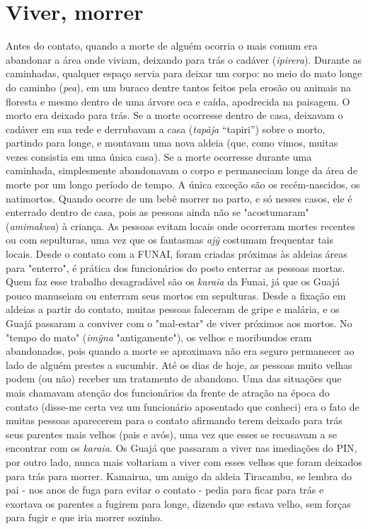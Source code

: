 \section{Viver, morrer}\label{viver-morrer}

Antes do contato, quando a morte de alguém ocorria o mais comum era
abandonar a área onde viviam, deixando para trás o cadáver
(\emph{ipirera}). Durante as caminhadas, qualquer espaço servia para
deixar um corpo: no meio do mato longe do caminho (\emph{pea}), em um
buraco dentre tantos feitos pela erosão ou animais na floresta e mesmo
dentro de uma árvore oca e caída, apodrecida na paisagem. O morto era
deixado para trás. Se a morte ocorresse dentro de casa, deixavam o
cadáver em sua rede e derrubavam a casa (\emph{tapãja} ``tapiri'') sobre
o morto, partindo para longe, e montavam uma nova aldeia (que, como
vimos, muitas vezes consistia em uma única casa). Se a morte ocorresse
durante uma caminhada, simplesmente abandonavam o corpo e permaneciam
longe da área de morte por um longo período de tempo. A única exceção
são os recém-nascidos, os natimortos. Quando ocorre de um bebê morrer no
parto, e só nesses casos, ele é enterrado dentro de casa, pois as
pessoas ainda não se "acostumaram" (\emph{amimakwa}) à criança. As
pessoas evitam locais onde ocorreram mortes recentes ou com sepulturas,
uma vez que os fantasmas \emph{ajỹ} costumam frequentar tais locais.
Desde o contato com a FUNAI, foram criadas próximas às aldeias áreas
para "enterro", é prática dos funcionários do posto enterrar as pessoas
mortas. Quem faz esse trabalho desagradável são os \emph{karaia} da
Funai, já que os Guajá pouco manuseiam ou enterram seus mortos em
sepulturas. Desde a fixação em aldeias a partir do contato, muitas
pessoas faleceram de gripe e malária, e os Guajá passaram a conviver com
o "mal-estar" de viver próximos aos mortos. No "tempo do mato"
(\emph{imỹna} "antigamente"), os velhos e moribundos eram abandonados,
pois quando a morte se aproximava não era seguro permanecer ao lado de
alguém prestes a sucumbir. Até os dias de hoje, as pessoas muito velhas
podem (ou não) receber um tratamento de abandono. Uma das situações que
mais chamavam atenção dos funcionários da frente de atração na época do
contato (disse-me certa vez um funcionário aposentado que conheci) era o
fato de muitas pessoas aparecerem para o contato afirmando terem deixado
para trás seus parentes mais velhos (pais e avós), uma vez que esses se
recusavam a se encontrar com os \emph{karaia}. Os Guajá que passaram a
viver nas imediações do PIN, por outro lado, nunca mais voltariam a
viver com esses velhos que foram deixados para trás para morrer.
Kamairua, um amigo da aldeia Tiracambu, se lembra do pai - nos anos de
fuga para evitar o contato - pedia para ficar para trás e exortava os
parentes a fugirem para longe, dizendo que estava velho, sem forças para
fugir e que iria morrer sozinho.

